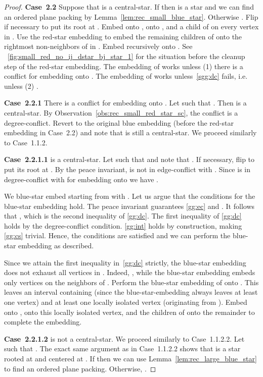 \documentclass[11pt,a4paper,colorlinks=true,urlcolor=blue,citecolor=red]{article}
\theoremstyle{plain}
\newcommand{\case}[1]{\par\vspace{.5\baselineskip}\noindent\textbf{\sffamily Case~#1}}
\begin{document}
\begin{proof}
  \case{2.2} Suppose that  is a central-star. If 
  then  is a star and we can find an ordered plane packing by
  Lemma~\ref{lem:rec_small_blue_star}. Otherwise . Flip
   if necessary to put its root at . Embed  onto
  ,  onto , and a child of  on every vertex in .
  Use the red-star embedding to embed the remaining children of
   onto the rightmost  non-neighbors of  in
  . Embed  recursively onto . See
  \figurename~\ref{fig:small_red_no_ij_dstar_bj_star_1} for the
  situation before the cleanup step of the red-star
  embedding. The embedding of  works unless (1) there is a conflict
  for embedding  onto . The embedding of  works
  unless~\ref{sgg:dc} fails, i.e. unless (2)
  .

  \case{2.2.1} There is a conflict for embedding  onto . Let
   such that . Then  is a
  central-star. By Observation~\ref{obs:rec_small_red_star_sc}, the
  conflict is a degree-conflict. Revert to the original blue embedding
  (before the red-star embedding in Case~2.2) and note that
   is still a central-star. We proceed similarly to Case~1.1.2.

  \case{2.2.1.1}  is a central-star. Let  such that
   and note that . If necessary, flip
   to put its root at . By the peace invariant,  is not in
  edge-conflict with . Since  is in degree-conflict with  for
  embedding  onto  we have .

  We blue-star embed  starting from  with
  . Let us argue that the conditions for the
  blue-star embedding hold. The peace invariant guarantees \ref{gg:ec}
  and . It follows that
  , which is the second inequality
  of \ref{gg:dc}. The first inequality of \ref{gg:dc} holds by the
  degree-conflict condition. \ref{gg:int} holds by construction, making
  \ref{gg:cs} trivial.  Hence, the conditions are satisfied and we can
  perform the blue-star embedding as described.

  Since we attain the first inequality in~\ref{gg:dc} strictly, the
  blue-star embedding does not exhaust all vertices in . Indeed,
  , while the blue-star embedding
  embeds only  vertices on the neighbors of .
  Perform the blue-star embedding of  onto . This leaves an
  interval containing  (since the blue-star-embedding always leaves
  at least one vertex) and at least one locally isolated vertex
  (originating from ). Embed  onto ,  onto this
  locally isolated vertex, and the children of  onto the remainder to
  complete the embedding.

  \case{2.2.1.2}  is not a central-star. We proceed
  similarly to Case~1.1.2.2. Let  such that . The
  exact same argument as in Case~1.1.2.2 shows that  is a star
  rooted at  and centered at . If  then we can use
  Lemma~\ref{lem:rec_large_blue_star} to find an ordered plane packing.
  Otherwise, .


\end{proof}
\end{document}
